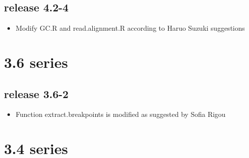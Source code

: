 \documentclass{article}
\begin{document}
\subsection*{release 4.2-4}
\begin{itemize}

\item Modify GC.R and read.alignment.R according to Haruo Suzuki suggestions

\end{itemize}




\section*{3.6 series}

\subsection*{release 3.6-2}
\begin{itemize}
\item Function extract.breakpoints is modified as suggested by Sofia Rigou
\end{itemize}


\section*{3.4 series}



\end{document}
